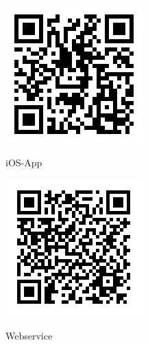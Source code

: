 \documentclass[12pt,titlepage]{article}
\begin{document}
\begin{center}
\begin{large}
\begin{figure}[ht]
  \centering
  \begin{minipage}[t][][b]{0.2\textwidth}
  \href{https://github.com/NicoIseli/IOS_App_Project}{\includegraphics[width=\textwidth]{Img/iosappqrcode.png}}
    \caption*{iOS-App}
  \end{minipage}
  \hfill
  \begin{minipage}[t][][b]{0.2\textwidth}
    \href{https://gitlab.enterpriselab.ch/foodprint/foodprint-backend-distribution}{\includegraphics[width=\textwidth]{Img/backendqrcode.png}}
    \caption*{Webservice}
  \end{minipage}
\end{figure}
\end{large}
\end{center}
\newpage
\end{document}
